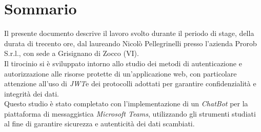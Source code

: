 \cleardoublepage
{}
{}
\begingroup
\let\clearpage\relax
\let\cleardoublepage\relax
\let\cleardoublepage\relax

\chapter*{Sommario}

Il presente documento descrive il lavoro svolto durante il periodo di stage, della durata di trecento ore, dal laureando Nicolò Pellegrinelli presso l'azienda Prorob S.r.l., con sede a Grisignano di Zocco (VI).\\
Il tirocinio si è sviluppato intorno allo studio dei metodi di autenticazione e autorizzazione alle risorse protette di un'applicazione web, con particolare attenzione all'uso di \emph{\gls{JWT}}\glsfirstoccur e dei protocolli adottati per garantire confidenzialità e integrità dei dati.\\
Questo studio è stato completato con l'implementazione di un \emph{ChatBot} per la piattaforma di messaggistica \emph{Microsoft Teams}, utilizzando gli strumenti studiati al fine di garantire sicurezza e autenticità dei dati scambiati.\\




\endgroup

\vfill
